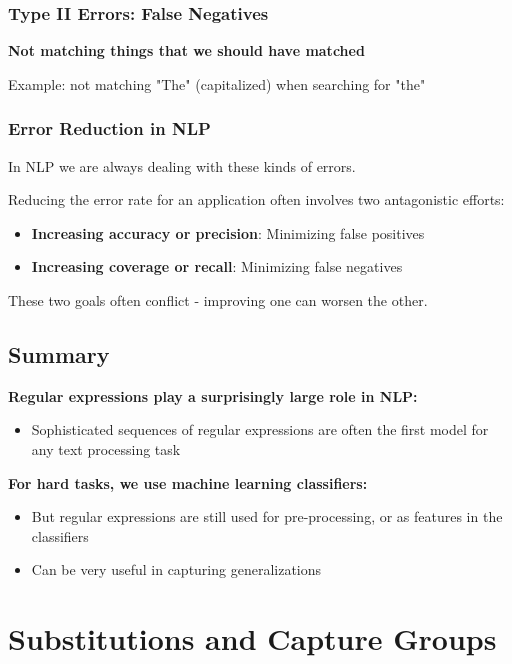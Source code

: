 \documentclass[11pt,a4paper]{article}
\theoremstyle{definition}
\theoremstyle{plain}
\theoremstyle{remark}
\begin{document}
\subsubsection{Type II Errors: False Negatives}

\textbf{Not matching things that we should have matched}

Example: not matching "The" (capitalized) when searching for "the"

\subsubsection{Error Reduction in NLP}

In NLP we are always dealing with these kinds of errors.

Reducing the error rate for an application often involves two antagonistic efforts:
\begin{itemize}
    \item \textbf{Increasing accuracy or precision}: Minimizing false positives
    \item \textbf{Increasing coverage or recall}: Minimizing false negatives
\end{itemize}

These two goals often conflict - improving one can worsen the other.

\subsection{Summary}

\textbf{Regular expressions play a surprisingly large role in NLP:}
\begin{itemize}
    \item Sophisticated sequences of regular expressions are often the first model for any text processing task
\end{itemize}

\textbf{For hard tasks, we use machine learning classifiers:}
\begin{itemize}
    \item But regular expressions are still used for pre-processing, or as features in the classifiers
    \item Can be very useful in capturing generalizations
\end{itemize}

\section{Substitutions and Capture Groups}
\end{document}

